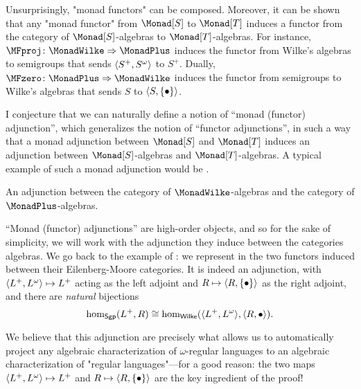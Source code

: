 Unsurprisingly, "monad functors" can be composed. Moreover, 
it can be shown that any "monad functor" from $\Monad[S]$ to $\Monad[T]$ induces
a functor from the category of $\Monad[S]$-algebras to $\Monad[T]$-algebras.
For instance, $\MFproj\colon \MonadWilke \Rightarrow \MonadPlus$ induces
the functor from Wilke's algebras to semigroups that sends $\tup{S^+,S^\omega}$
to $S^+$.
Dually, $\MFzero\colon \MonadPlus \Rightarrow \MonadWilke$ induces the functor
from semigroups to Wilke's algebras that sends $S$ to $\tup{S, \set{\bullet}}$.

I conjecture that we can naturally define a notion of ``monad (functor) adjunction'',
which generalizes the notion of ``functor adjunctions'',
in such a way that a monad adjunction between $\Monad[S]$ and $\Monad[T]$
induces an adjunction between $\Monad[S]$-algebras and $\Monad[T]$-algebras.
A typical example of such a monad adjunction would be
.

\begin{marginfigure}
	\centering
	\begin{tikzpicture}
		
	\end{tikzpicture}
	\caption{
		\AP\label{fig:adjunction-formal-finite-wilke}
		An adjunction between the category of
		$\MonadWilke$-algebras and the category of $\MonadPlus$-algebras.
	}
\end{marginfigure}
``Monad (functor) adjunctions'' are high-order objects, and so for the sake
of simplicity, we will work with the adjunction they induce between the categories
algebras. We go back to the example of :
we represent in  the two functors induced
between their Eilenberg-Moore categories.
It is indeed an adjunction, with $\tup{L^+, L^\omega} \mapsto L^+$ acting as the left
adjoint and $R \mapsto \tup{R,\set{\bullet}}$ as the right adjoint, and there
are \emph{natural} bijections
\[
	\textrm{hom}_{\cat{Sgp}}(L^+, R)
	\cong \textrm{hom}_{\cat{Wilke}}(\tup{L^+,L^\omega}, \tup{R,\bullet}).
\]

We believe that this adjunction are precisely what allows us to automatically project
any algebraic characterization of $\omega$-regular languages to an algebraic
characterization of "regular languages"---for a good reason: 
the two maps $\tup{L^+, L^\omega} \mapsto L^+$ and $R \mapsto \tup{R,\set{\bullet}}$
are the key ingredient of the proof!

